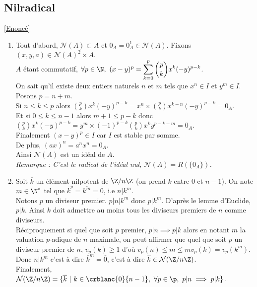 \documentclass[8pt]{book}
\begin{document}
	\subsection{Nilradical }
	\label{Nilradical corrigé}
	\textcolor{blue}{\hyperref[Nilradical]{[Enoncé]}}\\
	\begin{enumerate}[leftmargin=*]
		\item Tout d'abord, $\mathcal N(A)\subset A$ et $0_A=0_A^1\in \mathcal N(A)$. Fixons $(x,y,a)\in \mathcal N(A)^2\times A$.\\
		$A$ étant commutatif, $\forall p\in \N,\ (x-y)^p=\displaystyle\sum_{k=0}^p\binom{p}{k}x^k(-y)^{p-k}$.\\
		On sait qu'il existe deux entiers naturels $n$ et $m$ tels que $x^n\in I$ et $y^m\in I$. Posons $p=n+m$.\\
		Si $n\leq k\leq p$ alors $\displaystyle\binom{p}{k}x^k(-y)^{p-k}=x^n\times \binom{p}{k}x^{k-n}(-y)^{p-k}=0_A$.\\
		Et si $0\leq k\leq n-1$ alors $m+1\leq p-k$ donc $\displaystyle\binom{p}{k}x^k(-y)^{p-k}=y^m\times (-1)^{p-k}\binom{p}{k}x^ky^{p-k-m}=0_A$.\\
		Finalement $(x-y)^p\in I$ car $I$ est stable par somme.\\
		De plus, $(ax)^n=a^nx^n=0_A$.\\
		Ainsi $\mathcal N(A)$ est un idéal de $A$.\\
		\textit{Remarque : C'est le radical de l'idéal nul, $\mathcal N(A)=R(\{0_A\})$.}
		\item Soit $\overline k$ un élément nilpotent de $\Z/n\Z$ (on prend $k$ entre $0$ et $n-1$). On note $m\in \N^*$ tel que ${\overline k}^p=\overline{k^m}=\overline 0$, i.e $n|k^m$.\\
		Notons $p$ un diviseur premier. $p|n|k^m$ donc $p|k^m$. D'après le lemme d'Euclide, $p|k$. Ainsi $k$ doit admettre au moins tous les diviseurs premiers de $n$ comme diviseurs.\\
		Réciproquement si quel que soit $p$ premier, $p|n\implies p|k$ alors en notant $m$ la valuation $p$-adique de $n$ maximale, on peut affirmer que quel que soit $p$ un diviseur premier de $n$, $v_p(k)\geq 1$ d'où $v_p(n)\leq m\leq mv_p(k)=v_p(k^m)$. Donc $n|k^m$ c'est à dire ${\overline k}^m=\overline 0$, c'est à dire $\overline k\in \mathcal N(\Z/n\Z)$.\\
		Finalement, $\mathcal N(\Z/n\Z)=\{\overline k\ |\ k\in \crblanc{0}{n-1},\ \forall p\in \p,\ p|n\implies p|k\}$.
	\end{enumerate}
	
\end{document}
